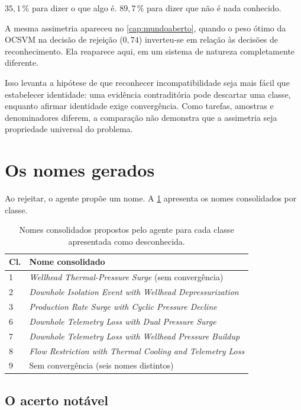 \begin{destaque}
$35{,}1\,\%$ para dizer o que algo é. $89{,}7\,\%$ para dizer que não é nada conhecido.

A mesma assimetria apareceu no \cref{cap:mundoaberto}, quando o peso ótimo da OCSVM na
decisão de rejeição ($0{,}74$) inverteu-se em relação às decisões de reconhecimento. Ela
reaparece aqui, em um sistema de natureza completamente diferente.

Isso levanta a hipótese de que reconhecer incompatibilidade seja mais fácil que
estabelecer identidade: uma evidência contraditória pode descartar uma classe, enquanto
afirmar identidade exige convergência. Como tarefas, amostras e denominadores diferem, a
comparação não demonstra que a assimetria seja propriedade universal do problema.
\end{destaque}

\section{Os nomes gerados}

Ao rejeitar, o agente propõe um nome. A \cref{tab:ag-nomes} apresenta os nomes
consolidados por classe.

\begin{table}[htbp]
\centering
\caption{Nomes consolidados propostos pelo agente para cada classe apresentada como
desconhecida.}
\label{tab:ag-nomes}
\small
\begin{tabular}{lp{8.2cm}}
\toprule
\textbf{Cl.} & \textbf{Nome consolidado} \\
\midrule
1 & \emph{Wellhead Thermal-Pressure Surge} (sem convergência) \\
2 & \emph{Downhole Isolation Event with Wellhead Depressurization} \\
3 & \emph{Production Rate Surge with Cyclic Pressure Decline} \\
6 & \emph{Downhole Telemetry Loss with Dual Pressure Surge} \\
7 & \emph{Downhole Telemetry Loss with Wellhead Pressure Buildup} \\
8 & \emph{Flow Restriction with Thermal Cooling and Telemetry Loss} \\
9 & Sem convergência (seis nomes distintos) \\
\bottomrule
\end{tabular}
\end{table}

\subsection{O acerto notável}


